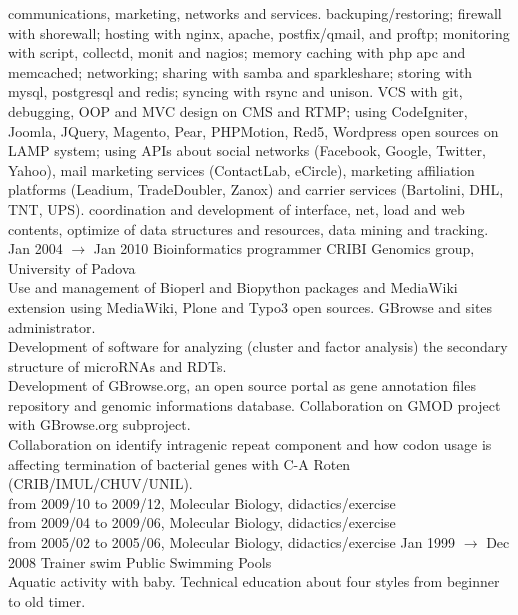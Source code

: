 \documentclass[8pt]{stackoverflow-upgraded-version} %
\begin{document}
\begin{entrylist}
{		communications, marketing, networks and services.  backuping/restoring; firewall with shorewall; hosting with
		nginx, apache, postfix/qmail, and proftp; monitoring with script, collectd, monit and nagios; memory caching with php apc and
		memcached; networking; sharing with samba and sparkleshare; storing with mysql, postgresql and redis; syncing with rsync
		and unison.  VCS with git, debugging, OOP and MVC design on CMS and RTMP; using CodeIgniter, Joomla, JQuery,
		Magento, Pear, PHPMotion, Red5, Wordpress open sources on LAMP system; using APIs about social networks (Facebook, Google, Twitter, Yahoo),
		mail marketing services (ContactLab, eCircle), marketing affiliation platforms (Leadium, TradeDoubler, Zanox) and carrier services (Bartolini, DHL, TNT, UPS).
		 coordination and development of interface, net, load and web contents, optimize of data structures and resources, data mining and tracking.}
	\entry
		{Jan 2004 $\rightarrow$ Jan 2010}
		{Bioinformatics programmer}
		{CRIBI Genomics group, University of Padova}
		{\\
		Use and management of Bioperl and Biopython packages and MediaWiki extension using MediaWiki, Plone and Typo3 open sources. GBrowse and sites administrator.\\
		Development of software for analyzing (cluster and factor analysis) the secondary structure of microRNAs and RDTs.\\
		Development of GBrowse.org, an open source portal as gene annotation files repository and genomic informations database.
		Collaboration on GMOD project with GBrowse.org subproject.\\
		Collaboration on identify intragenic repeat component and how codon usage is affecting termination of bacterial genes with C-A Roten (CRIB/IMUL/CHUV/UNIL).\\
		from 2009/10 to 2009/12, Molecular Biology, didactics/exercise\\
		from 2009/04 to 2009/06, Molecular Biology, didactics/exercise\\
		from 2005/02 to 2005/06, Molecular Biology, didactics/exercise}
	\entry
		{Jan 1999 $\rightarrow$ Dec 2008}
		{Trainer swim}
		{Public Swimming Pools}
		{\\
		Aquatic activity with baby. Technical education about four styles from beginner to old timer.\\
}
\end{entrylist}
\end{document}
